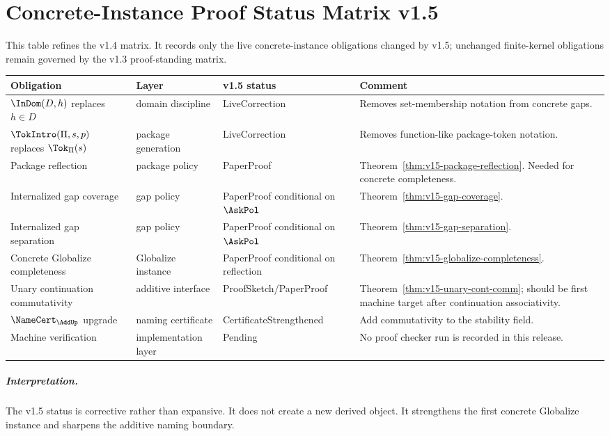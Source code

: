 \chapter{Concrete-Instance Proof Status Matrix v1.5}
\label{ch:v15-status-matrix}

This table refines the v1.4 matrix. It records only the live concrete-instance obligations changed by v1.5; unchanged finite-kernel obligations remain governed by the v1.3 proof-standing matrix.

\begin{longtable}{p{}p{}p{}p{}}
\toprule
\textbf{Obligation} & \textbf{Layer} & \textbf{v1.5 status} & \textbf{Comment}\\
\midrule
\(\InDom(D,h)\) replaces \(h\in D\) & domain discipline & LiveCorrection & Removes set-membership notation from concrete gaps.\\
\(\TokIntro(\Pi,s,p)\) replaces \(\Tok_{\Pi}(s)\) & package generation & LiveCorrection & Removes function-like package-token notation.\\
Package reflection & package policy & PaperProof & Theorem~\ref{thm:v15-package-reflection}. Needed for concrete completeness.\\
Internalized gap coverage & gap policy & PaperProof conditional on \(\AskPol\) & Theorem~\ref{thm:v15-gap-coverage}.\\
Internalized gap separation & gap policy & PaperProof conditional on \(\AskPol\) & Theorem~\ref{thm:v15-gap-separation}.\\
Concrete Globalize completeness & Globalize instance & PaperProof conditional on reflection & Theorem~\ref{thm:v15-globalize-completeness}.\\
Unary continuation commutativity & additive interface & ProofSketch/PaperProof & Theorem~\ref{thm:v15-unary-cont-comm}; should be first machine target after continuation associativity.\\
\(\NameCert_{\AddUp}\) upgrade & naming certificate & CertificateStrengthened & Add commutativity to the stability field.\\
Machine verification & implementation layer & Pending & No proof checker run is recorded in this release.\\
\bottomrule
\end{longtable}

\paragraph{Interpretation.}
The v1.5 status is corrective rather than expansive. It does not create a new derived object. It strengthens the first concrete Globalize instance and sharpens the additive naming boundary.
